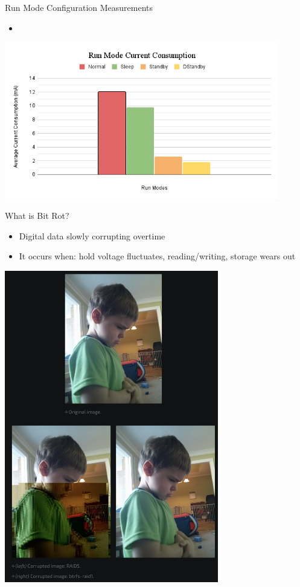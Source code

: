 \begin{frame}{Run Mode Configuration Measurements}
    \begin{itemize}
        \item 
    \end{itemize}
    \includegraphics[height=0.5\textheight,width=0.9\textwidth,keepaspectratio]{images/run_modes.png}
\end{frame}

\begin{frame}{What is Bit Rot?}
    \begin{itemize}
        \item Digital data slowly corrupting overtime
        \item It occurs when: hold voltage fluctuates, reading/writing, storage wears out
    \end{itemize}
    \centering
    \includegraphics[height=0.7\textheight,width=0.7\textwidth,keepaspectratio]{images/bit_flip.png}
\end{frame}

